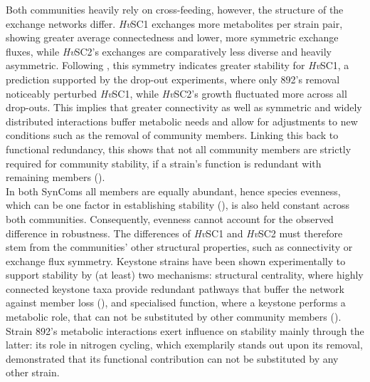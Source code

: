 Both communities heavily rely on cross-feeding, however, the structure of the exchange networks differ. \textit{Hv}SC1 exchanges more metabolites per strain pair, showing greater average connectedness and lower, more symmetric exchange fluxes, while \textit{Hv}SC2's exchanges are comparatively less diverse and heavily asymmetric. Following \cite{butler_stability_2018}, this symmetry indicates greater stability for \textit{Hv}SC1, a prediction supported by the drop-out experiments, where only 892's removal noticeably perturbed \textit{Hv}SC1, while \textit{Hv}SC2's growth fluctuated more across all drop-outs. This implies that greater connectivity as well as symmetric and widely distributed interactions buffer metabolic needs and allow for adjustments to new conditions such as the removal of community members. Linking this back to functional redundancy, this shows that not all community members are strictly required for community stability, if a strain’s function is redundant with remaining members (\cite{allison_resistance_2008}).
\\


In both SynComs all members are equally abundant, hence species evenness, which can be one factor in establishing stability (\cite{wittebolle_initial_2009}), is also held constant across both communities. Consequently, evenness cannot account for the observed difference in robustness. The differences of \textit{Hv}SC1 and \textit{Hv}SC2 must therefore stem from the communities' other structural properties, such as connectivity or exchange flux symmetry. 
Keystone strains have been shown experimentally to support stability by (at least) two mechanisms: structural centrality, where highly connected keystone taxa provide redundant pathways that buffer the network against member loss (\cite{liu_keystone_2025}), and specialised function, where a keystone performs a metabolic role, that can not be substituted by other community members (\cite{iram_deciphering_2025, xun_specialized_2021}). Strain 892’s metabolic interactions exert influence on stability mainly through the latter: its role in nitrogen cycling, which exemplarily stands out upon its removal, demonstrated that its functional contribution can not be substituted by any other strain. 
\\


